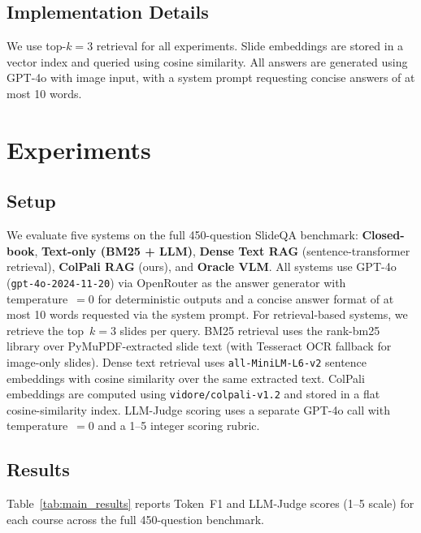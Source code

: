\documentclass{article} %
\begin{document}
\subsection{Implementation Details}

We use top-$k=3$ retrieval for all experiments. Slide embeddings are stored in a vector index and queried using cosine similarity. All answers are generated using GPT-4o with image input, with a system prompt requesting concise answers of at most 10 words.

\section{Experiments}

\subsection{Setup}

We evaluate five systems on the full 450-question SlideQA benchmark: \textbf{Closed-book}, \textbf{Text-only (BM25 + LLM)}, \textbf{Dense Text RAG} (sentence-transformer retrieval), \textbf{ColPali RAG} (ours), and \textbf{Oracle VLM}. All systems use GPT-4o (\texttt{gpt-4o-2024-11-20}) via OpenRouter as the answer generator with temperature~$= 0$ for deterministic outputs and a concise answer format of at most 10 words requested via the system prompt. For retrieval-based systems, we retrieve the top~$k{=}3$ slides per query. BM25 retrieval uses the rank-bm25 library over PyMuPDF-extracted slide text (with Tesseract OCR fallback for image-only slides). Dense text retrieval uses \texttt{all-MiniLM-L6-v2} sentence embeddings with cosine similarity over the same extracted text. ColPali embeddings are computed using \texttt{vidore/colpali-v1.2} and stored in a flat cosine-similarity index. LLM-Judge scoring uses a separate GPT-4o call with temperature~$= 0$ and a 1--5 integer scoring rubric.

\subsection{Results}

Table~\ref{tab:main_results} reports Token~F1 and LLM-Judge scores (1--5 scale) for each course across the full 450-question benchmark.
\end{document}
